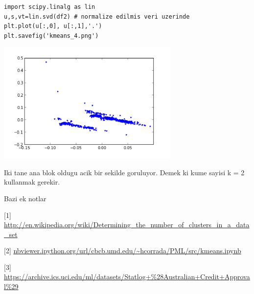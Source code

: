 \documentclass[12pt,fleqn]{article}\usepackage{../common}
\begin{document}
\begin{verbatim}
import scipy.linalg as lin
u,s,vt=lin.svd(df2) # normalize edilmis veri uzerinde
plt.plot(u[:,0], u[:,1],'.')
plt.savefig('kmeans_4.png')
\end{verbatim}

\includegraphics[height=6cm]{kmeans_4.png}

Iki tane ana blok oldugu acik bir sekilde goruluyor. Demek ki kume sayisi
k = 2 kullanmak gerekir. 

Bazi ek notlar

[1] \url{http://en.wikipedia.org/wiki/Determining_the_number_of_clusters_in_a_data_set}

[2] \url{nbviewer.ipython.org/url/cbcb.umd.edu/~hcorrada/PML/src/kmeans.ipynb}

[3] \url{https://archive.ics.uci.edu/ml/datasets/Statlog+%28Australian+Credit+Approval%29}
\end{document}
